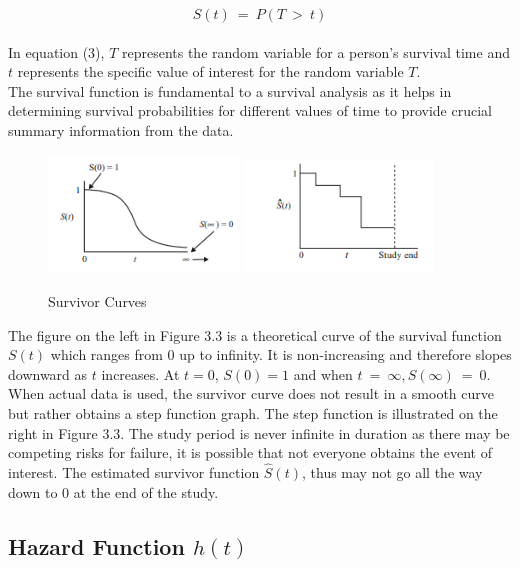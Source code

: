 \documentclass[doublespacing]{report} %
\begin{document}
\[S(t)\ =\ P(T\ >\ t)\]
\\In equation (3), \(T\) represents the random variable for a person's survival time and \(t\) represents the specific value of interest for the random variable \(T\).
\\The survival function is  fundamental to a survival analysis as it helps in determining survival probabilities for different values of time to provide crucial summary information from the data.
\begin{figure}[H]
    \centering
    \includegraphics[width=0.45\textwidth]{Figure 3/3.31.png}
    \hfill
    \includegraphics[width=0.45\textwidth]{Figure 3/3.32.png}
    \caption{Survivor Curves}
    \label{Figure 3.3}
\end{figure}

The figure on the left in Figure 3.3 is a theoretical curve of the survival function\ \(S\left(t\right) \) which ranges from 0 up to infinity. It is non-increasing and therefore slopes downward as \(t\) increases. At \(t= 0\), \(S\left(0\right)=1\) and when \( t\ =\ \infty , S\left(\infty\right)\ =\ 0.\) 
When actual data is used, the survivor curve does not result in a smooth curve but rather obtains a step function graph. The step function is illustrated on the right in Figure 3.3.  The study period is never infinite in duration as there may be competing risks for failure, it is possible that not everyone obtains the event of interest. The estimated survivor function \(\hat{S}\left(t\right)\), thus may not go all the way down to 0 at the end of the study.

\subsection{\texorpdfstring{Hazard Function \( h(t) \)}{Hazard Function h(t)}}
\end{document}
